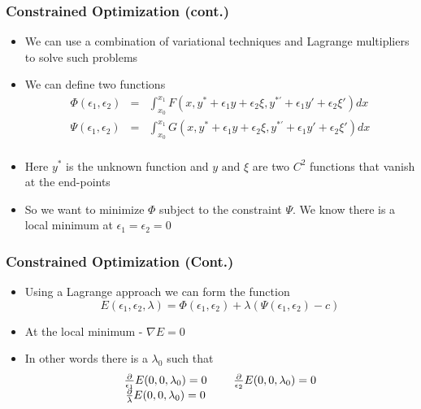 \documentclass[10pt]{beamer}
\begin{document}
\begin{frame}
  \frametitle{Constrained Optimization (cont.)}
  \begin{itemize}
  \item We can use a combination of variational techniques and Lagrange multipliers to solve such problems
  \item We can define two functions
    \[
      \begin{array}{rcl}
        \Phi(\epsilon_1,\epsilon_2) & = & \int_{x_0}^{x_1} F(x, y^{*} + \epsilon_1 y + \epsilon_2 \xi, y^{*'} + \epsilon_1 y' + \epsilon_2 \xi {'}) dx\\
        \Psi(\epsilon_1,\epsilon_2) & = & \int_{x_0}^{x_1} G(x, y^{*} + \epsilon_1 y + \epsilon_2 \xi, y^{*'} + \epsilon_1 y' + \epsilon_2 \xi {'}) dx\\
      \end{array}
    \]
  \item Here $y^*$ is the unknown function and $y \mbox{ and } \xi$
    are two $C^2$ functions that vanish at the end-points
  \item So we want to minimize $\Phi$ subject to the constraint
    $\Psi$. We know there is a local minimum at
    $\epsilon_1 = \epsilon_2 = 0$
  \end{itemize}
\end{frame}

\begin{frame}
  \frametitle{Constrained Optimization (Cont.)}
  \begin{itemize}
  \item Using a Lagrange approach we can form the function
    \[
      E(\epsilon_1, \epsilon_2, \lambda) =
      \Phi( \epsilon_1, \epsilon_2 ) + \lambda (\Psi(\epsilon_1, \epsilon_2 ) - c)
    \]
    
  \item At the local minimum - $\nabla E = 0$
  \item In other words there is a $\lambda_0$ such that
    \[
      \begin{array}[c]{ccc}
        \frac{\partial}{\epsilon_1} E(0,0,\lambda_0) = 0  & \mbox{~~  ~~}&
        \frac{\partial}{\epsilon_2} E(0,0,\lambda_0) = 0  \\
        \frac{\partial}{\lambda} E(0,0,\lambda_0) = 0 && \\        
      \end{array}
    \]
  \end{itemize}
\end{frame}
\end{document}
